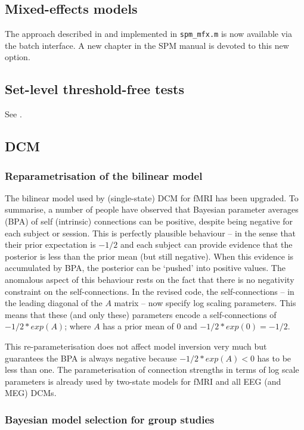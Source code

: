 \documentclass[a4paper,titlepage,openany]{article}
\begin{document}
\begin{multicols}{2}
\subsection{Mixed-effects models}

The approach described in \cite{karl_mixed} and implemented in \texttt{spm\_mfx.m} is now available via the batch interface. A new chapter in the SPM manual is devoted to this new option.

\subsection{Set-level threshold-free tests}

See \cite{Barnes2013}.

\subsection{DCM}

\subsubsection{Reparametrisation of the bilinear model}

The bilinear model used by (single-state) DCM for fMRI has been upgraded. To summarise, a number of people have observed that Bayesian parameter averages (BPA) of self (intrinsic) connections can be positive, despite being negative for each subject or session. This is perfectly plausible behaviour -- in the sense that their prior expectation is $-1/2$ and each subject can provide evidence that the posterior is less than the prior mean (but still negative). When this evidence is accumulated by BPA, the posterior can be `pushed' into positive values. The anomalous aspect of this behaviour rests on the fact that there is no negativity constraint on the self-connections.  In the revised code, the self-connections -- in the leading diagonal of the $A$ matrix -- now specify log scaling parameters. This means that these (and only these) parameters encode a self-connections of $-1/2*exp(A)$; where $A$ has a prior mean of $0$ and $-1/2*exp(0) = -1/2$.

This re-parameterisation does not affect model inversion very much but guarantees the BPA is always negative because $-1/2*exp(A) < 0$ has to be less than one. The parameterisation of connection strengths in terms of log scale parameters is already used by two-state models for fMRI and all EEG (and MEG) DCMs.

\subsubsection{Bayesian model selection for group studies}


\end{multicols}
\end{document}
